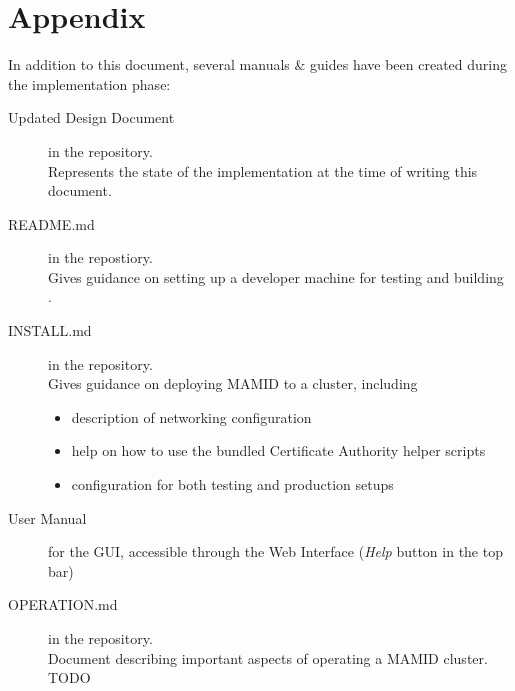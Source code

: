 \section{Appendix}

In addition to this document, several manuals \& guides have been created during the implementation phase:

\begin{description}
\item[Updated Design Document] in the  repository.\\
      Represents the state of the implementation at the time of writing this document.
\item[README.md] in the  repostiory.\\
      Gives guidance on setting up a developer machine for testing and building \mamid.
\item[INSTALL.md] in the  repository.\\
      Gives guidance on deploying MAMID to a cluster, including 
      \begin{itemize}
        \item description of networking configuration
        \item help on how to use the bundled Certificate Authority helper scripts
        \item configuration for both testing and production setups
      \end{itemize}
\item[User Manual] for the GUI, accessible through the \mamid Web Interface (\textit{Help} button in the top bar)
\item[OPERATION.md] in the  repository.\\
      Document describing important aspects of operating a MAMID cluster. TODO
\end{description}
